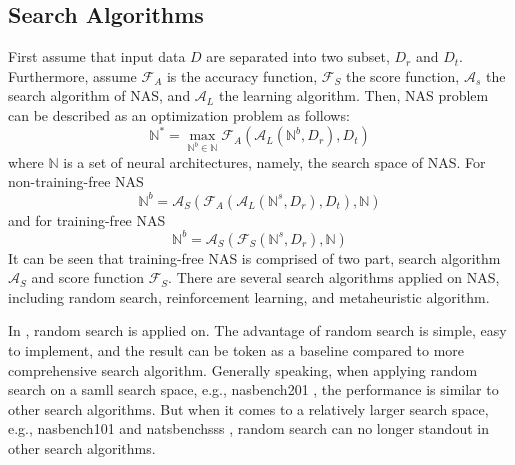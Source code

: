 \documentclass[sigconf]{acmart}
\begin{document}
    \subsection{Search Algorithms}
    First assume that input data $D$ are separated into two subset, $D_r$ and $D_t$. Furthermore, 
    assume $\mathcal F_A$ is the accuracy function, $\mathcal F_S$ the score function, $\mathcal A_s$ the 
    search algorithm of NAS, and $\mathcal A_L$ the learning algorithm. Then, NAS problem can be 
    described as an optimization problem as follows: 
    \begin{equation}
        \label{equ:nas}
        \mathbb N^*=\max_{\mathbb N^b\in\mathbb N}\mathcal F_A(\mathcal A_L(\mathbb N^b, D_r), D_t)
    \end{equation}
    where $\mathbb N$ is a set of neural architectures, namely, the search space of NAS. 
    For non-training-free NAS 
    \begin{equation}
        \label{equ:non-training_free_nas}
        \mathbb N^b=\mathcal A_S(\mathcal F_A(\mathcal A_L(\mathbb N^s, D_r), D_t), \mathbb N)
    \end{equation}
    and for training-free NAS 
    \begin{equation}
        \label{equ:training_free_nas}
        \mathbb N^b=\mathcal A_S(\mathcal F_S(\mathbb N^s, D_r), \mathbb N)
    \end{equation}
    It can be seen that training-free NAS is comprised of two part, search algorithm $\mathcal A_S$ and score 
    function $\mathcal F_S$. 
    There are several search algorithms applied on NAS, including random search, reinforcement learning, and
    metaheuristic algorithm. 
    
    In \cite{https://doi.org/10.48550/arxiv.2006.04647} \cite{Lopes_2021}, random search is applied on. 
    The advantage of random search is simple, easy to implement, and the result can be token as a 
    baseline compared to more comprehensive search algorithm. Generally speaking, when applying random 
    search on a samll search space, e.g., nasbench201 \cite{dong2020nasbench201}, the performance is 
    similar to other search algorithms. But when it comes to a relatively larger search space, e.g., nasbench101 
    \cite{ying2019nasbench101} and natsbenchsss \cite{Dong_2021}, random search can no longer standout 
    in other search algorithms. 
\end{document}
